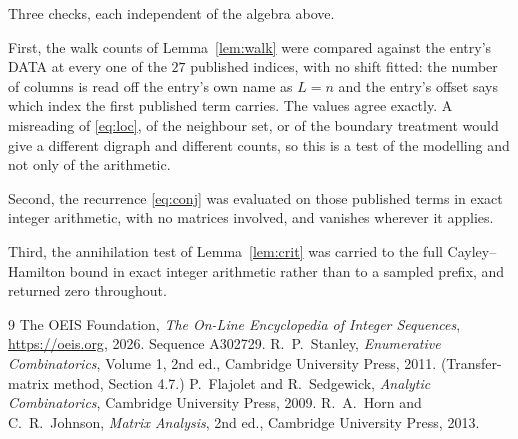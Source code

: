 \documentclass[11pt,a4paper]{article}
\theoremstyle{plain}
\theoremstyle{definition}
\begin{document}
Three checks, each independent of the algebra above.

First, the walk counts of Lemma~\ref{lem:walk} were compared against the entry's DATA at
every one of the $27$ published indices, with no shift fitted: the number of columns is
read off the entry's own name as $L=n$ and the entry's offset says which index the first
published term carries. The values agree exactly. A misreading of \eqref{eq:loc}, of the
neighbour set, or of the boundary treatment would give a different digraph and different
counts, so this is a test of the modelling and not only of the arithmetic.

Second, the recurrence \eqref{eq:conj} was evaluated on those published terms in exact
integer arithmetic, with no matrices involved, and vanishes wherever it applies.

Third, the annihilation test of Lemma~\ref{lem:crit} was carried to the full
Cayley--Hamilton bound in exact integer arithmetic rather than to a sampled prefix, and
returned zero throughout.

\begin{thebibliography}{9}
 The OEIS Foundation, \emph{The On-Line Encyclopedia of Integer
Sequences}, \url{https://oeis.org}, 2026. Sequence A302729.
 R.~P.~Stanley, \emph{Enumerative Combinatorics}, Volume 1, 2nd ed.,
Cambridge University Press, 2011. (Transfer-matrix method, Section 4.7.)
 P.~Flajolet and R.~Sedgewick, \emph{Analytic Combinatorics}, Cambridge
University Press, 2009.
 R.~A.~Horn and C.~R.~Johnson, \emph{Matrix Analysis}, 2nd ed., Cambridge
University Press, 2013.
\end{thebibliography}
\end{document}
